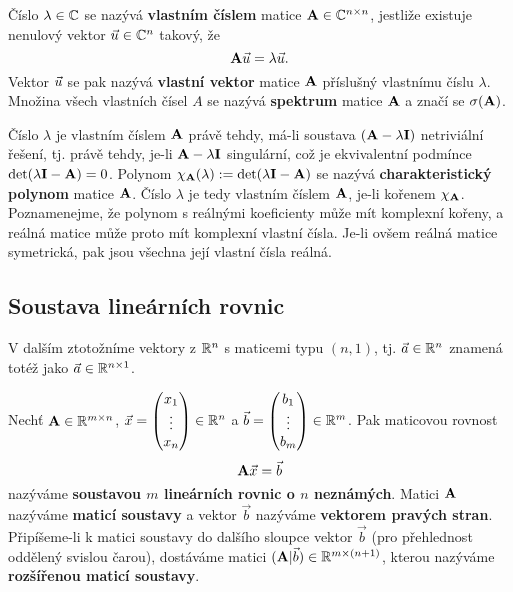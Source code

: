 \begin{df}
Číslo $\lambda\in\mathbb C$ se nazývá {\bf vlastním číslem} matice $\mathbf{A}\in\mathbb C^{n\times n}$, jestliže existuje nenulový vektor $\vec{u}\in\mathbb C^n$ takový, že
$$ \mathbf{A}\vec{u}=\lambda\vec{u}. $$
Vektor $\vec{u}$ se pak nazývá {\bf vlastní vektor} matice $\mathbf{A}$ příslušný vlastnímu číslu $\lambda$.
Množina všech vlastních čísel $A$ se nazývá {\bf spektrum} matice $\mathbf{A}$ a značí se $\sigma(\mathbf{A})$.
\end{df}
Číslo $\lambda$ je vlastním číslem $\mathbf{A}$ právě tehdy, má-li soustava $(\mathbf{A}-\lambda\mathbf{I})$ netriviální řešení, tj. právě tehdy, je-li $\mathbf{A}-\lambda\mathbf{I}$ singulární, což je ekvivalentní podmínce $\det(\lambda\mathbf{I}-\mathbf{A})=0$.
Polynom $\chi_{\mathbf{A}}(\lambda):=\det(\lambda\mathbf{I}-\mathbf{A})$ se nazývá {\bf charakteristický polynom} matice $\mathbf{A}$.
Číslo $\lambda$ je tedy vlastním číslem $\mathbf{A}$, je-li kořenem $\chi_{\mathbf{A}}$.
Poznamenejme, že polynom s reálnými koeficienty může mít komplexní kořeny, a reálná matice může proto mít komplexní vlastní čísla.
Je-li ovšem reálná matice symetrická, pak jsou všechna její vlastní čísla reálná.






\subsection{Soustava lineárních rovnic}

V dalším ztotožníme vektory z $\mathbb R^n$ s maticemi typu $(n,1)$, tj. $\vec a\in\mathbb R^n$ znamená totéž jako $\vec a\in\mathbb R^{n\times 1}$.

\begin{df}
Nechť $\mathbf{A}\in\mathbb R^{m\times n}$, $\vec{x}=\begin{pmatrix}x_1\\\vdots\\x_n\end{pmatrix}\in\mathbb R^{n}$ a $\vec b=\begin{pmatrix}b_1\\\vdots\\b_m\end{pmatrix}\in\mathbb R^{m}$.
Pak maticovou rovnost
$$ \mathbf{A}\vec{x}=\vec b $$
nazýváme {\bf soustavou $m$ lineárních rovnic o $n$ neznámých}.
Matici $\mathbf{A}$ nazýváme {\bf maticí soustavy} a vektor $\vec b$ nazýváme {\bf vektorem pravých stran}.
Připíšeme-li k matici soustavy do dalšího sloupce vektor $\vec b$ (pro přehlednost oddělený svislou čarou), dostáváme matici $(\mathbf{A}|\vec b)\in\mathbb R^{m\times(n+1)}$, kterou nazýváme {\bf rozšířenou maticí soustavy}.
\end{df}

